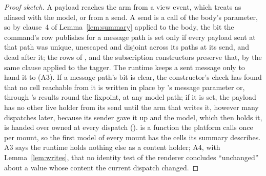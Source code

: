 \begin{proof}[Proof sketch]
A payload reaches the arm from a view event, which  treats as aliased with the model, or from a
send. A send is a call of the body's  parameter, so by clause~4 of Lemma~\ref{lem:summary}
applied to the body, the bit the command's row publishes for a message path is set only if every payload
sent at that path was unique, unescaped and disjoint across its paths at its send, and dead after it; the
rows of ,  and the subscription constructors preserve that, by the same
clause applied to the tagger. The runtime keeps a sent message only to hand it to  (A3). If
a message path's bit is clear, the constructor's check has found that no cell reachable from it is written
in place by 's message parameter or, through 's results round the fixpoint, at
any model path; if it is set, the payload has no other live holder from its send until the arm that writes
it, however many dispatches later, because its sender gave it up and the model, which then holds it, is
handed over owned at every dispatch ().  is a function the platform calls once per
mount, so the first model of every mount has the cells its summary describes. A3 says the runtime holds
nothing else as a content holder; A4, with Lemma~\ref{lem:writes}, that no identity test of the renderer
concludes ``unchanged'' about a value whose content the current dispatch changed.
\end{proof}


